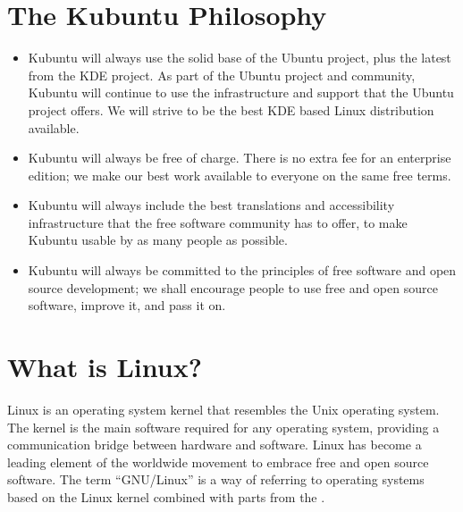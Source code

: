 \documentclass[letterpaper,10pt,english]{sphinxmanual}
\begin{document}
\section{The Kubuntu Philosophy}
\label{\detokenize{welcome:the-kubuntu-philosophy}}\begin{itemize}
\item {} 
\sphinxAtStartPar
Kubuntu will always use the solid base of the Ubuntu project, plus the latest from the KDE project. As part of the Ubuntu project and community, Kubuntu will continue to use the infrastructure and support that the Ubuntu project offers. We will strive to be the best KDE based Linux distribution available.

\item {} 
\sphinxAtStartPar
Kubuntu will always be free of charge. There is no extra fee for an enterprise edition; we make our best work available to everyone on the same free terms.

\item {} 
\sphinxAtStartPar
Kubuntu will always include the best translations and accessibility infrastructure that the free software community has to offer, to make Kubuntu usable by as many people as possible.

\item {} 
\sphinxAtStartPar
Kubuntu will always be committed to the principles of free software and open source development; we shall encourage people to use free and open source software, improve it, and pass it on.

\end{itemize}


\section{What is Linux?}
\label{\detokenize{welcome:what-is-linux}}
\sphinxAtStartPar
Linux is an operating system kernel that resembles the Unix operating system. The kernel is the main software required for any operating system, providing a communication bridge between hardware and software. Linux has become a leading element of the worldwide movement to embrace free and open source software. The term “GNU/Linux” is a way of referring to operating systems based on the Linux kernel combined with parts from the .
\end{document}
